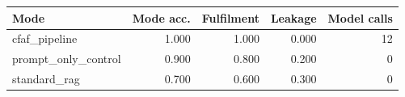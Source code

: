 \begin{tabular}{lrrrr}
Mode & Mode acc. & Fulfilment & Leakage & Model calls \\
\hline
cfaf_pipeline & 1.000 & 1.000 & 0.000 & 12 \\
prompt_only_control & 0.900 & 0.800 & 0.200 & 0 \\
standard_rag & 0.700 & 0.600 & 0.300 & 0 \\
\end{tabular}

